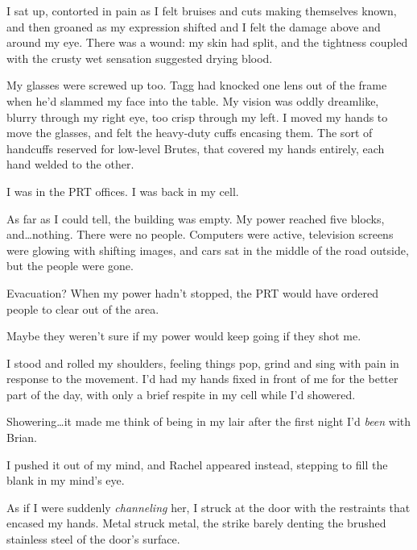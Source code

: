 I sat up, contorted in pain as I felt bruises and cuts making themselves known, and then groaned as my expression shifted and I felt the damage above and around my eye.  There was a wound: my skin had split, and the tightness coupled with the crusty wet sensation suggested drying blood.



My glasses were screwed up too.  Tagg had knocked one lens out of the frame when he'd slammed my face into the table.  My vision was oddly dreamlike, blurry through my right eye, too crisp through my left.  I moved my hands to move the glasses, and felt the heavy-duty cuffs encasing them.  The sort of handcuffs reserved for low-level Brutes, that covered my hands entirely, each hand welded to the other.



I was in the PRT offices.  I was back in my cell.



As far as I could tell, the building was empty.  My power reached five blocks, and\ldots nothing.  There were no people. Computers were active, television screens were glowing with shifting images, and cars sat in the middle of the road outside, but the people were gone.



Evacuation?  When my power hadn't stopped, the PRT would have ordered people to clear out of the area.



Maybe they weren't sure if my power would keep going if they shot me.



I stood and rolled my shoulders, feeling things pop, grind and sing with pain in response to the movement.  I'd had my hands fixed in front of me for the better part of the day, with only a brief respite in my cell while I'd showered.



Showering\ldots it made me think of being in my lair after the first night I'd \emph{been} with Brian.



I pushed it out of my mind, and Rachel appeared instead, stepping to fill the blank in my mind's eye.



As if I were suddenly \emph{channeling} her, I struck at the door with the restraints that encased my hands.  Metal struck metal, the strike barely denting the brushed stainless steel of the door's surface.



